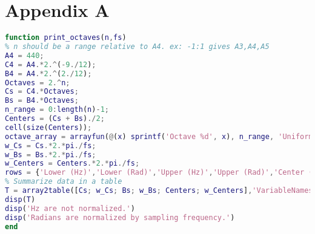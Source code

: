 \documentclass[a4paper, 11pt]{exam}
\begin{document}
\section*{Appendix A}
\begin{lstlisting}[language=Matlab]
function print_octaves(n,fs)
% n should be a range relative to A4. ex: -1:1 gives A3,A4,A5
A4 = 440;
C4 = A4.*2.^(-9./12);
B4 = A4.*2.^(2./12);
Octaves = 2.^n;
Cs = C4.*Octaves;
Bs = B4.*Octaves;
n_range = 0:length(n)-1;
Centers = (Cs + Bs)./2;
cell(size(Centers));
octave_array = arrayfun(@(x) sprintf('Octave %d', x), n_range, 'UniformOutput', false);
w_Cs = Cs.*2.*pi./fs;
w_Bs = Bs.*2.*pi./fs;
w_Centers = Centers.*2.*pi./fs;
rows = {'Lower (Hz)','Lower (Rad)','Upper (Hz)','Upper (Rad)','Center (Hz)','Center (Rad)'};
% Summarize data in a table
T = array2table([Cs; w_Cs; Bs; w_Bs; Centers; w_Centers],'VariableNames',octave_array,'RowName',rows);
disp(T)
disp('Hz are not normalized.')
disp('Radians are normalized by sampling frequency.')
end 
\end{lstlisting}
\end{document}
